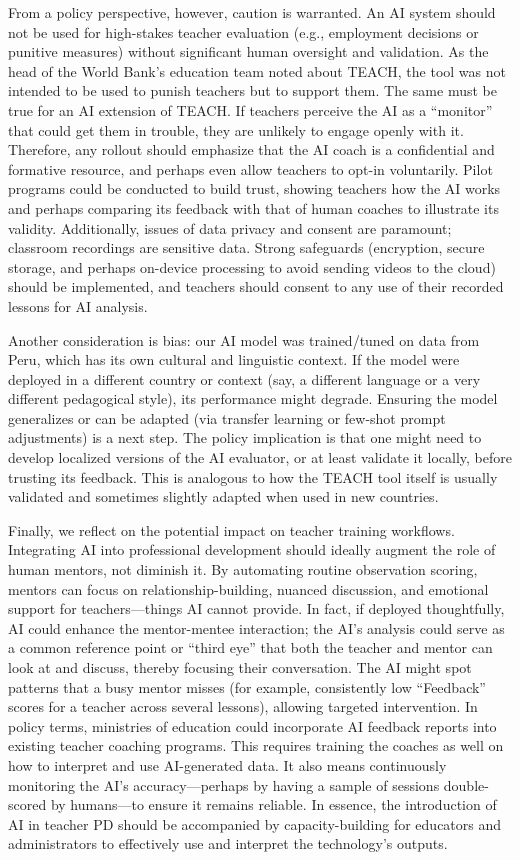 \documentclass[12pt]{article}
\begin{document}
From a policy perspective, however, caution is warranted. An AI system should not be used for high-stakes teacher evaluation (e.g., employment decisions or punitive measures) without significant human oversight and validation. As the head of the World Bank’s education team noted about TEACH, the tool was not intended to be used to punish teachers but to support them. The same must be true for an AI extension of TEACH. If teachers perceive the AI as a “monitor” that could get them in trouble, they are unlikely to engage openly with it. Therefore, any rollout should emphasize that the AI coach is a confidential and formative resource, and perhaps even allow teachers to opt-in voluntarily. Pilot programs could be conducted to build trust, showing teachers how the AI works and perhaps comparing its feedback with that of human coaches to illustrate its validity. Additionally, issues of data privacy and consent are paramount; classroom recordings are sensitive data. Strong safeguards (encryption, secure storage, and perhaps on-device processing to avoid sending videos to the cloud) should be implemented, and teachers should consent to any use of their recorded lessons for AI analysis.

Another consideration is bias: our AI model was trained/tuned on data from Peru, which has its own cultural and linguistic context. If the model were deployed in a different country or context (say, a different language or a very different pedagogical style), its performance might degrade. Ensuring the model generalizes or can be adapted (via transfer learning or few-shot prompt adjustments) is a next step. The policy implication is that one might need to develop localized versions of the AI evaluator, or at least validate it locally, before trusting its feedback. This is analogous to how the TEACH tool itself is usually validated and sometimes slightly adapted when used in new countries.

Finally, we reflect on the potential impact on teacher training workflows. Integrating AI into professional development should ideally augment the role of human mentors, not diminish it. By automating routine observation scoring, mentors can focus on relationship-building, nuanced discussion, and emotional support for teachers—things AI cannot provide. In fact, if deployed thoughtfully, AI could enhance the mentor-mentee interaction; the AI’s analysis could serve as a common reference point or “third eye” that both the teacher and mentor can look at and discuss, thereby focusing their conversation. The AI might spot patterns that a busy mentor misses (for example, consistently low “Feedback” scores for a teacher across several lessons), allowing targeted intervention. In policy terms, ministries of education could incorporate AI feedback reports into existing teacher coaching programs. This requires training the coaches as well on how to interpret and use AI-generated data. It also means continuously monitoring the AI’s accuracy—perhaps by having a sample of sessions double-scored by humans—to ensure it remains reliable. In essence, the introduction of AI in teacher PD should be accompanied by capacity-building for educators and administrators to effectively use and interpret the technology’s outputs.
\end{document}
